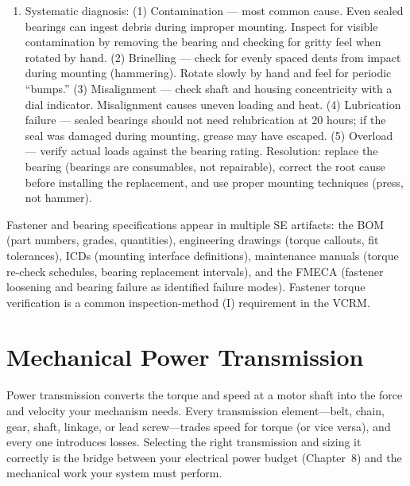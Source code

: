 \documentclass[11pt,letterpaper,twoside,openany]{book}
\begin{document}
\begin{enumerate}[leftmargin=1.5em]
\item Systematic diagnosis: (1) Contamination --- most common cause. Even sealed bearings can ingest debris during improper mounting. Inspect for visible contamination by removing the bearing and checking for gritty feel when rotated by hand. (2) Brinelling --- check for evenly spaced dents from impact during mounting (hammering). Rotate slowly by hand and feel for periodic ``bumps.'' (3) Misalignment --- check shaft and housing concentricity with a dial indicator. Misalignment causes uneven loading and heat. (4) Lubrication failure --- sealed bearings should not need relubrication at 20 hours; if the seal was damaged during mounting, grease may have escaped. (5) Overload --- verify actual loads against the bearing rating. Resolution: replace the bearing (bearings are consumables, not repairable), correct the root cause before installing the replacement, and use proper mounting techniques (press, not hammer).
\end{enumerate}

\begin{tipbox}
Fastener and bearing specifications appear in multiple SE artifacts: the BOM (part numbers, grades, quantities), engineering drawings (torque callouts, fit tolerances), ICDs (mounting interface definitions), maintenance manuals (torque re-check schedules, bearing replacement intervals), and the FMECA (fastener loosening and bearing failure as identified failure modes). Fastener torque verification is a common inspection-method (I) requirement in the VCRM.
\end{tipbox}



\FloatBarrier
\chapter{Mechanical Power Transmission}

\vspace{1em}

\begin{keyconceptbox}
Power transmission converts the torque and speed at a motor shaft into the force and velocity your mechanism needs. Every transmission element---belt, chain, gear, shaft, linkage, or lead screw---trades speed for torque (or vice versa), and every one introduces losses. Selecting the right transmission and sizing it correctly is the bridge between your electrical power budget (Chapter~8) and the mechanical work your system must perform.
\end{keyconceptbox}
\end{document}
